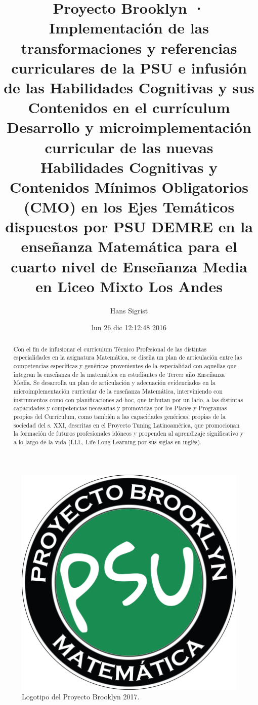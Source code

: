 \documentclass[12pt,letterpaper,article,x11names]{memoir}
\title{}
\author{Hans Sigrist}
\date{lun 26 dic 12:12:48 2016}
\title{Proyecto Brooklyn · Implementación de las transformaciones y referencias curriculares de la PSU e infusión de las Habilidades Cognitivas y sus Contenidos en el currículum\\\medskip
\large Desarrollo y microimplementación curricular de las nuevas Habilidades Cognitivas y Contenidos Mínimos Obligatorios (CMO) en los Ejes Temáticos dispuestos por PSU DEMRE en la enseñanza Matemática para el cuarto nivel de Enseñanza Media en Liceo Mixto Los Andes}
\begin{document}
\maketitle
\begin{figure}[htbp]
\centering
\includegraphics[width=.9\linewidth]{brooklyn_logo.png}
\caption{\label{fig:org46a129d}
Logotipo del Proyecto Brooklyn 2017.}
\end{figure}



\begin{abstract}
Con el fin de infusionar el currículum Técnico Profesional de las distintas especialidades en la asignatura Matemática, se diseña un plan de articulación entre las competencias específicas y genéricas provenientes de la especialidad con aquellas que integran la enseñanza de la matemática en estudiantes de Tercer año Enseñanza Media. Se desarrolla un plan de articulación y adecuación evidenciados en la microimplementación curricular de la enseñanza Matemática, interviniendo con instrumentos como con planificaciones ad-hoc, que tributan por un lado, a las distintas capacidades y competencias necesarias y promovidas por los Planes y Programas propios del Currículum, como también a las capacidades genéricas, propias de la sociedad del s. XXI, descritas en el Proyecto Tuning Latinoamérica, que promocionan la formación de futuros profesionales idóneos y propenden al aprendizaje significativo y a lo largo de la vida (LLL, Life Long Learning por sus siglas en inglés).
\end{abstract}
\end{document}

